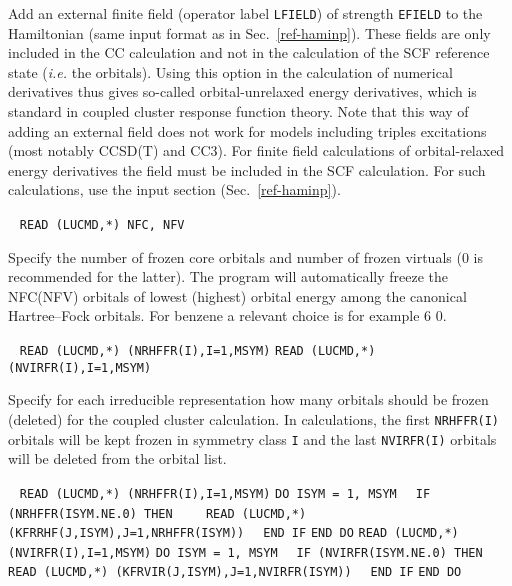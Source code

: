 \begin{description}
    Add an external finite field (operator label \verb+LFIELD+)
    of strength \verb+EFIELD+ to the Hamiltonian
    (same input format as in Sec.~\ref{ref-haminp}).
    These fields are only included in the CC calculation and 
    not in the calculation of the SCF reference state 
    ({\it i.e.\/} the orbitals). 
    Using this option in the calculation of numerical derivatives 
    thus gives so-called orbital-unrelaxed energy derivatives, 
    which is standard in coupled cluster response function theory.
    Note that this way of adding an external field does not work for 
    models including triples excitations (most notably CCSD(T) and CC3).
    For finite field calculations of orbital-relaxed energy 
    derivatives the field must be included in the SCF calculation.
    For such calculations, use the input section  (Sec.~\ref{ref-haminp}).
 
\item[\Key{FREEZE}] \verb| |\newline
      \verb|READ (LUCMD,*) NFC, NFV|

     Specify the number of frozen core orbitals and number of frozen virtuals (0 is recommended for the latter).
     The program will automatically freeze the NFC(NFV) orbitals of lowest (highest) orbital energy
     among the canonical Hartree--Fock orbitals.
     For benzene a relevant choice is for example 6 0.

\item[\Key{FROIMP}] \verb| |\newline
      \verb|READ (LUCMD,*) (NRHFFR(I),I=1,MSYM)|\newline
      \verb|READ (LUCMD,*) (NVIRFR(I),I=1,MSYM)|

      Specify for each irreducible representation how
      many orbitals should be frozen (deleted) for the coupled
      cluster calculation. In calculations, the first \verb+NRHFFR(I)+
      orbitals will be kept frozen in symmetry class \verb+I+ and
      the last \verb+NVIRFR(I)+ orbitals will be deleted from the 
      orbital list.
 
\item[\Key{FROEXP}]  \verb| |\newline
    \verb|READ (LUCMD,*) (NRHFFR(I),I=1,MSYM)|\newline
    \verb|DO ISYM = 1, MSYM|\newline
    \verb|  IF (NRHFFR(ISYM.NE.0) THEN|\newline
    \verb|    READ (LUCMD,*) (KFRRHF(J,ISYM),J=1,NRHFFR(ISYM))|\newline
    \verb|  END IF|\newline
    \verb|END DO|\newline
    \verb|READ (LUCMD,*) (NVIRFR(I),I=1,MSYM)|\newline
    \verb|DO ISYM = 1, MSYM|\newline
    \verb|  IF (NVIRFR(ISYM.NE.0) THEN|\newline
    \verb|    READ (LUCMD,*) (KFRVIR(J,ISYM),J=1,NVIRFR(ISYM))|\newline
    \verb|  END IF|\newline
    \verb|END DO|


\end{description}
